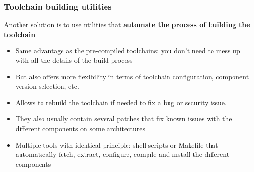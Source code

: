 \begin{frame}
  \frametitle{Toolchain building utilities}
  Another solution is to use utilities that {\bf automate the process of
  building the toolchain}
  \begin{itemize}
  \item Same advantage as the pre-compiled toolchains: you don't need
    to mess up with all the details of the build process
  \item But also offers more flexibility in terms of toolchain
    configuration, component version selection, etc.
  \item Allows to rebuild the toolchain if needed to fix a bug or
    security issue.
  \item They also usually contain several patches that fix known
    issues with the different components on some architectures
  \item Multiple tools with identical principle: shell scripts or
    Makefile that automatically fetch, extract, configure, compile and
    install the different components
\end{itemize}
\end{frame}

